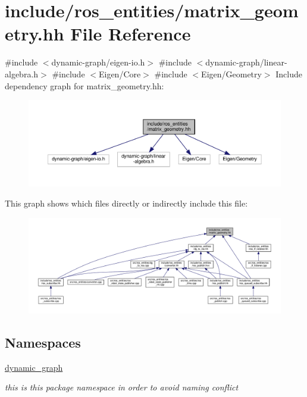 \hypertarget{matrix__geometry_8hh}{}\section{include/ros\+\_\+entities/matrix\+\_\+geometry.hh File Reference}
\label{matrix__geometry_8hh}
{\ttfamily \#include $<$dynamic-\/graph/eigen-\/io.\+h$>$}\newline
{\ttfamily \#include $<$dynamic-\/graph/linear-\/algebra.\+h$>$}\newline
{\ttfamily \#include $<$Eigen/\+Core$>$}\newline
{\ttfamily \#include $<$Eigen/\+Geometry$>$}\newline
Include dependency graph for matrix\+\_\+geometry.\+hh\+:
\nopagebreak
\begin{figure}[H]
\begin{center}
\leavevmode
\includegraphics[width=350pt]{matrix__geometry_8hh__incl}
\end{center}
\end{figure}
This graph shows which files directly or indirectly include this file\+:
\nopagebreak
\begin{figure}[H]
\begin{center}
\leavevmode
\includegraphics[width=350pt]{matrix__geometry_8hh__dep__incl}
\end{center}
\end{figure}
\subsection*{Namespaces}
\begin{DoxyCompactItemize}
\item 
 \hyperlink{namespacedynamic__graph}{dynamic\+\_\+graph}
\begin{DoxyCompactList}\small\item\em this is this package namespace in order to avoid naming conflict \end{DoxyCompactList}\end{DoxyCompactItemize}
